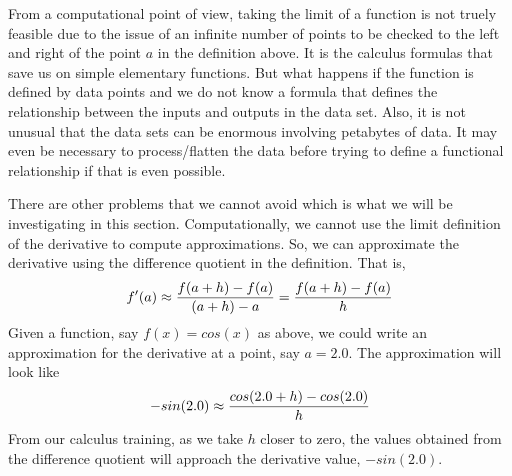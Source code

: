 \documentclass[10pt,fleqn]{article}
\begin{document}
From a computational point of view, taking the limit of a function is not truely
feasible due to the issue of an infinite number of points to be checked to the
left and right of the point \(a\) in the definition above. It is the calculus
formulas that save us on simple elementary functions. But what happens if the
function is defined by data points and we do not know a formula that defines the
relationship between the inputs and outputs in the data set. Also, it is not
unusual that the data sets can be enormous involving petabytes of data. It may
even be necessary to process/flatten the data before trying to define a
functional relationship if that is even possible. 

There are other problems that we cannot avoid which is what we will be
investigating in this section. Computationally, we cannot use the limit
definition of the derivative to compute approximations. So, we can approximate
the derivative using the difference quotient in the definition. That is,
\[
  f'(a) \approx {{f(a+h)-f(a)}\over{(a+h)-a}} = {{f(a+h)-f(a)}\over{h}}
\]
Given a function, say \(f(x)=cos(x)\) as above, we could write an approximation
for the derivative at a point, say \(a=2.0\). The approximation will look like
\[
  -sin(2.0) \approx {{cos(2.0+h)-cos(2.0)}\over{h}}
\]
From our calculus training, as we take \(h\) closer to zero, the values obtained
from the difference quotient will approach the derivative value, \(-sin(2.0)\).
\end{document}

